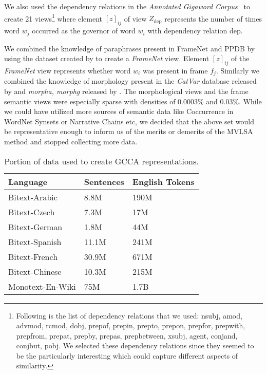 \documentclass[11pt]{article}
\newcommand{\xline}[0]{\noindent\underline{\makebox[0.1cm][l]{}}}
\begin{document}
We also used the dependency relations in the \textit{Annotated
  Gigaword Corpus}~\cite{annotatedGigaword12} to create 21
views\footnote{Following is the list of dependency relations that we
  used: nsubj, amod, advmod, rcmod, dobj, prep\xline{}of,
  prep\xline{}in, prep\xline{}to, prep\xline{}on, prep\xline{}for,
  prep\xline{}with, prep\xline{}from, prep\xline{}at, prep\xline{}by,
  prep\xline{}as, prep\xline{}between, xsubj, agent, conj\xline{}and,
  conj\xline{}but, pobj. We selected these dependency relations since
  they seemed to be the particularly interesting which could capture
  different aspects of similarity.}  where element $[z]_{ij}$ of view
$Z_{\textrm{dep}}$ represents the number of times word $w_j$ occurred
as the governor of word $w_i$ with dependency relation $\textrm{dep}$.

We combined the knowledge of paraphrases present in FrameNet and PPDB by
using the dataset created by  to create a
\textit{FrameNet} view. Element $[z]_{ij}$ of the \textit{FrameNet}
view represents whether word $w_i$ was present in frame
$f_j$. Similarly we combined the knowledge of morphology present in
the \textit{CatVar} database released by  and
\textit{morpha, morphg} released by .
The morphological views and the frame semantic views were especially
sparse with densities of 0.0003\% and 0.03\%. While we could have utilized more sources of semantic data like
Coccurrence in WordNet Synsets or Narrative Chains etc, we decided
that the above set would be representative enough to inform us of the
merits or demerits of the MVLSA method and stopped collecting more data.

\begin{table}[htbp]
  \centering
  \begin{tabular}{lll}
    Language & Sentences & English Tokens \\
    \hline
    Bitext-Arabic   & 8.8M   & 190M  \\
    Bitext-Czech    & 7.3M   & 17M   \\
    Bitext-German   & 1.8M   & 44M   \\
    Bitext-Spanish  & 11.1M  & 241M  \\
    Bitext-French   & 30.9M  & 671M  \\
    Bitext-Chinese  & 10.3M  & 215M  \\
    Monotext-En-Wiki& 75M    & 1.7B 
  \end{tabular}  
  \caption{Portion of data used to create GCCA representations.}
  \label{tab:dataperlang}
\end{table}
\end{document}
